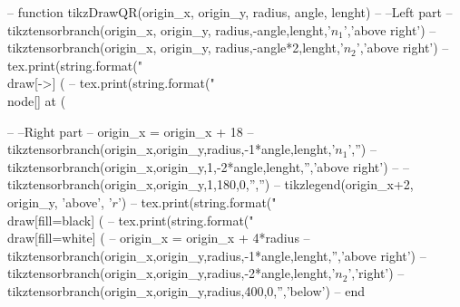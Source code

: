 \begin{luacode*}
    -- function tikzDrawQR(origin_x, origin_y, radius, angle, lenght)
    --   --Left part
    --     tikztensorbranch(origin_x, origin_y, radius,-angle,lenght,'$n_{1}$','above right')
    --     tikztensorbranch(origin_x, origin_y, radius,-angle*2,lenght,'$n_{2}$','above right')
    --     tex.print(string.format("\\draw[->] (%
    --     tex.print(string.format("\\node[] at (%
  
    --   --Right part
    --     origin_x = origin_x + 18
    --     tikztensorbranch(origin_x,origin_y,radius,-1*angle,lenght,'$n_{1}$','')
    --     tikztensorbranch(origin_x,origin_y,1,-2*angle,lenght,'','above right')
    --     --tikztensorbranch(origin_x,origin_y,1,180,0,'','')
    --     tikzlegend(origin_x+2, origin_y, 'above', '$r$')
    --     tex.print(string.format("\\draw[fill=black] (%
    --     tex.print(string.format("\\draw[fill=white] (%
    --     origin_x = origin_x + 4*radius
    --     tikztensorbranch(origin_x,origin_y,radius,-1*angle,lenght,'','above right')
    --     tikztensorbranch(origin_x,origin_y,radius,-2*angle,lenght,'$n_{2}$','right')
    --     tikztensorbranch(origin_x,origin_y,radius,400,0,'','below')
    -- end
  

\end{luacode*}
